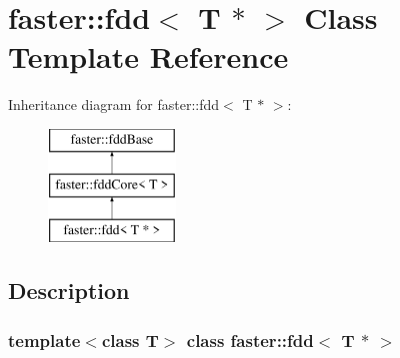 \hypertarget{classfaster_1_1fdd_3_01T_01_5_01_4}{}\section{faster\+:\+:fdd$<$ T $\ast$ $>$ Class Template Reference}
\label{classfaster_1_1fdd_3_01T_01_5_01_4}
Inheritance diagram for faster\+:\+:fdd$<$ T $\ast$ $>$\+:\begin{figure}[H]
\begin{center}
\leavevmode
\includegraphics[height=3.000000cm]{classfaster_1_1fdd_3_01T_01_5_01_4}
\end{center}
\end{figure}


\subsection{Description}
\subsubsection*{template$<$class T$>$\newline
class faster\+::fdd$<$ T $\ast$ $>$}

